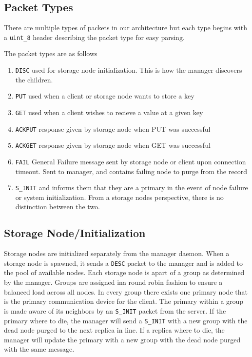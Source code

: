 \documentclass{article}
\begin{document}
\subsection{Packet Types}
There are multiple types of packets in our architecture but each type begins with a \texttt{uint\_8} header describing the packet type for easy parsing.

The packet types are as follows
\begin{enumerate}
    \item \texttt{DISC}
    \subitem used for storage node initialization. This is how the manager discovers the children.
    \item \texttt{PUT}
    \subitem used when a client or storage node wants to store a key
    \item \texttt{GET}
    \subitem used when a client wishes to recieve a value at a given key
    \item \texttt{ACKPUT}
    \subitem response given by storage node when PUT was successful
    \item \texttt{ACKGET}
    \subitem response given by storage node when GET was successful
    \item \texttt{FAIL}
    \subitem General Failure message sent by storage node or client upon connection timeout. Sent to manager, and contains failing node to purge from the record
    \item \texttt{S\_INIT}
    \subitem and informs them that they are a primary in the event of node 
    failure or system initialization. From a storage nodes perspective, there is no distinction between the two.
\end{enumerate}

\subsection{Storage Node/Initialization}
Storage nodes are initialized separately from the manager daemon.
When a storage node is spawned, it sends a \texttt{DESC} packet to the manager and is added to the pool of available nodes.
Each storage node is apart of a group as determined by the manager.
Groups are assigned ina round robin fashion to ensure a balanced load across all nodes.
In every group there exists one primary node that is the primary communication device for the client.
The primary within a group is made aware of its neighbors by an \texttt{S\_INIT} packet from the server. If the primary where to die, 
the manager will send a \texttt{S\_INIT} with a new group with the dead node purged to the next replica in line. If a replica where to die,
the manager will update the primary with a new group with the dead node purged with the same message.
\pagebreak
\end{document}
